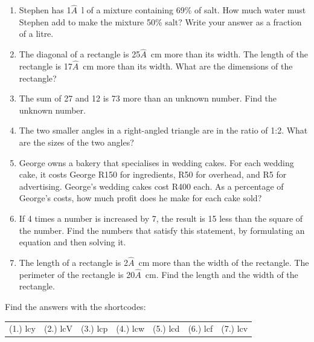     \noindent
\label{m39262*secfhsst!!!underscore!!!id6331}
            \nopagebreak
        \label{m39262*id162712}\begin{enumerate}[noitemsep, label=\textbf{\arabic*}. ] 
            \label{m39262*uid112}\item Stephen has 1\ensuremath{\hat{A}}~l of a mixture containing 69\% of salt. How much water must Stephen add to make the mixture 50\% salt? Write your answer as a fraction of a litre.
\hspace{1ex}        
\label{m39262*uid113}\item The diagonal of a rectangle is 25\ensuremath{\hat{A}}~cm more than its width. The length of the rectangle is 17\ensuremath{\hat{A}}~cm more than its width. What are the dimensions of the rectangle?
\hspace{1ex}        
\label{m39262*uid114}\item The sum of 27 and 12 is 73 more than an unknown number. Find the unknown number.
\hspace{1ex}        
\label{m39262*uid115}\item The two smaller angles in a right-angled triangle are in the ratio of 1:2. What are the sizes of the two angles?
\hspace{1ex}        
\label{m39262*uid116}\item George owns a bakery that specialises in wedding cakes. For each wedding cake, it costs George R150 for ingredients, R50 for overhead, and R5 for advertising. George's wedding cakes cost R400 each. As a percentage of George's costs, how much profit does he make for each cake sold?
\hspace{1ex}        
\label{m39262*uid117}\item If 4 times a number is increased by 7, the result is 15 less than the square of the number. Find the numbers that satisfy this statement, by formulating an equation and then solving it.
\hspace{1ex}        
\label{m39262*uid118}\item The length of a rectangle is 2\ensuremath{\hat{A}}~cm more than the width of the rectangle. The perimeter of the rectangle is 20\ensuremath{\hat{A}}~cm. Find the length and the width of the rectangle.
\hspace{1ex}        
\end{enumerate}
\label{m39262**end}
\par {} Find the answers with the shortcodes:
 \par \begin{tabular}[h]{cccccc}
 (1.) lcy  &  (2.) lcV  &  (3.) lcp  &  (4.) lcw  &  (5.) lcd  &  (6.) lcf  &  (7.) lcv  & \end{tabular}
